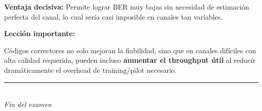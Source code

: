 \documentclass[11pt,a4paper]{article}
\begin{document}
\textbf{Ventaja decisiva:} Permite lograr BER muy bajas sin necesidad de estimaci\'on perfecta del canal, lo cual ser\'ia casi imposible en canales tan variables.

\textbf{Lecci\'on importante:}

C\'odigos correctores no solo mejoran la fiabilidad, sino que en canales dif\'iciles con alta calidad requerida, pueden incluso \textbf{aumentar el throughput \'util} al reducir dram\'aticamente el overhead de training/pilot necesario.




\vspace{1cm}
\begin{center}
\rule{0.8\linewidth}{0.4pt}\\
\textit{Fin del examen}
\end{center}
\end{document}
